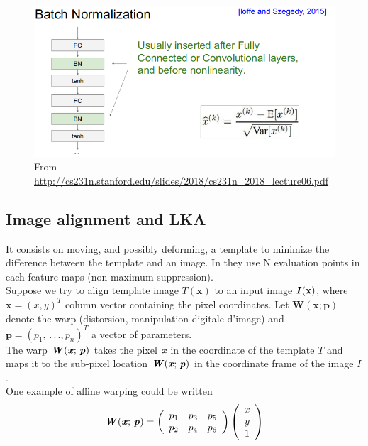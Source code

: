 \documentclass[a4paper,12pt]{report}
\newcommand\bk{\color{black}}
\newcommand\brick{\color{brick}}
\numberwithin{equation}{section} %
\begin{document}
\newpage

\begin{figure}[!ht]
\centering
\includegraphics[scale=0.5]{BN_CNN.png}
\captionsetup{labelformat=empty}
\caption{From \url{http://cs231n.stanford.edu/slides/2018/cs231n_2018_lecture06.pdf}}
\end{figure}

\newpage

\brick \subsection{Image alignment and LKA} \bk
It consists on moving, and possibly deforming, a template to minimize the difference between the template and an image. In \citep{gens2014deep} they use N evaluation points in each feature maps (non-maximum suppression).\\
Suppose we try to align template image $T(\textbf{x})$ to an input image $\textbf{\textit{I}}(\textbf{x})$, where $\textbf{x} = (x,y)^T$ column vector containing the pixel coordinates. Let $\textbf{W}(\textbf{x}; \textbf{p})$ denote the warp (distorsion, manipulation digitale d'image) and $\textbf{p} = (p_1,\, .\, .\, ., p_n)^T$ a vector of parameters.\\

The warp $\textbf{\textit{W}}(\textbf{\textit{x}};\, \textbf{\textit{p}})$ takes the pixel $\textit{\textbf{x}}$ in the coordinate of the template $T$ and maps it to the sub-pixel location $\textbf{\textit{W}}(\textbf{\textit{x}};\, \textbf{\textit{p}})$ in the coordinate frame of the image $I$. \\

One example of affine warping could be written 
\begin{equation*}
\textbf{\textit{W}}(\textbf{\textit{x}};\, \textbf{\textit{p}}) =  
\left( 
	{\begin{array}{cccc}
		p_1& p_3 & p_5 \\
		p_2& p_4 & p_6
 	\end{array} } 
\right)
\left( 
	{\begin{array}{c}
		x \\
		y \\
		1
	\end{array} }
\right)
\end{equation*}
\end{document}
